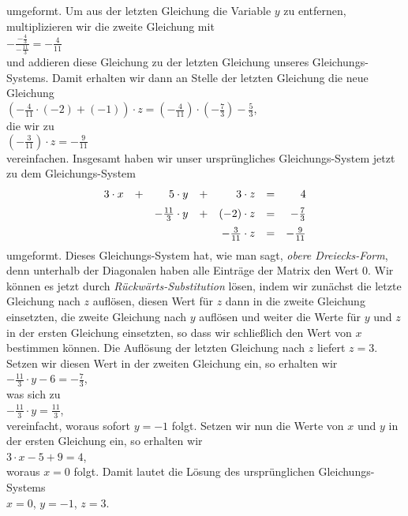 umgeformt.  Um aus der letzten Gleichung die Variable $y$ zu entfernen, multiplizieren wir die zweite
Gleichung mit
\\[0.2cm]
\hspace*{1.3cm}
$\displaystyle -\frac{-\frac{4}{3}}{-\frac{11}{3}} = -\frac{4}{11}$
\\[0.2cm]
und addieren diese Gleichung zu der letzten Gleichung unseres Gleichungs-Systems.  Damit erhalten wir
dann an Stelle der letzten Gleichung die neue Gleichung
\\[0.2cm]
\hspace*{1.3cm}
$\left(-\frac{4}{11} \cdot (-2) + (-1)\right) \cdot z = 
 \left(-\frac{4}{11}\right) \cdot \left(-\frac{7}{3}\right) - \frac{5}{3}
$,
\\[0.2cm]
die wir zu
\\[0.2cm]
\hspace*{1.3cm}
$\left(-\frac{3}{11}\right) \cdot z = -\frac{9}{11}$
\\[0.2cm]
vereinfachen.  Insgesamt haben wir unser ursprüngliches Gleichungs-System jetzt zu dem Gleichungs-System
\begin{equation}
  \label{eq:gauss2} 
\begin{array}[c]{rcrcrcr}
  3 \cdot x & + & 5 \cdot y             & + &    3 \cdot z  & = &           4  \\[0.2cm]
            &   & -\frac{11}{3} \cdot y & + & (-2) \cdot z  & = & -\frac{7}{3} \\[0.2cm]
            &   &                       &   & -\frac{3}{11} \cdot z & = & -\frac{9}{11}
\end{array}
\end{equation}
umgeformt.  Dieses Gleichungs-System hat, wie man sagt, \emph{obere Dreiecks-Form}, denn
unterhalb der Diagonalen haben alle Einträge der Matrix den Wert $0$.
Wir können es jetzt durch
\emph{Rückwärts-Substitution} lösen, indem wir zunächst die letzte Gleichung nach $z$ auflösen, diesen
Wert für $z$ dann in die zweite Gleichung einsetzten, die zweite Gleichung nach $y$ auflösen und weiter
die Werte für $y$ und $z$ in der ersten Gleichung einsetzten, so dass wir schließlich den Wert von $x$
bestimmen können.  Die Auflösung der letzten Gleichung nach $z$ liefert $z = 3$.  Setzen wir diesen Wert
in der zweiten Gleichung ein, so erhalten wir
\\[0.2cm]
\hspace*{1.3cm} $-\frac{11}{3} \cdot y - 6 = -\frac{7}{3}$,
\\[0.2cm]
was sich zu
\\[0.2cm]
\hspace*{1.3cm} $-\frac{11}{3} \cdot y = \frac{11}{3}$,
\\[0.2cm]
vereinfacht, woraus sofort $y = -1$ folgt.  Setzen wir nun die Werte von $x$ und $y$ in der ersten
Gleichung ein, so erhalten wir
\\[0.2cm]
\hspace*{1.3cm} $3 \cdot x - 5 + 9 = 4$,
\\[0.2cm]
woraus $x = 0$ folgt. Damit lautet die Lösung des ursprünglichen Gleichungs-Systems
\\[0.2cm]
\hspace*{1.3cm} 
$x = 0$, \quad $y = -1$, \quad $z = 3$.
\pagebreak


